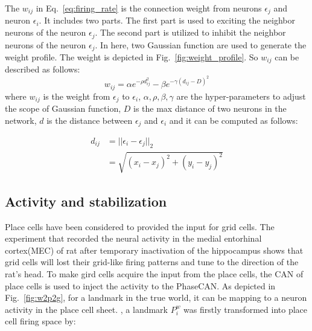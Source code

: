 \documentclass[final,5p,times,twocolumn,authoryear]{elsarticle}
\newcommand{\pt}[1]{{\color{red}{#1}}}
\begin{document}
The $w_{ij}$ in Eq.~\eqref{eq:firing_rate} is the connection weight from neurons $\epsilon_j$ and neuron $\epsilon_i$. It includes two parts. The first part is used to exciting the neighbor neurons of the neuron $\epsilon_j$. The second part is utilized to inhibit the neighbor neurons of the neuron $\epsilon_j$. In here, two Gaussian function are used to generate the weight profile. The weight is depicted in Fig.~\ref{fig:weight_profile}. So $w_{ij}$ can be described as follows:
\begin{equation}\label{eq:weight_gc}
	w_{ij}=\alpha e^{-\rho d_{ij}^2} - \beta e^{-\gamma (d_{ij}-D)^2}
\end{equation}
where $w_{ij}$ is the weight from $\epsilon_{j}$ to $\epsilon_{i}$, $\alpha,\rho,\beta,\gamma$ are the hyper-parameters to adjust the scope of Gaussian function, $D$ is the max distance of two neurons in the network, $d$ is the distance between $\epsilon_{j}$ and $\epsilon_{i}$ and it can be computed as follows:

\begin{align}
	d_{ij} &= ||\epsilon_{i} - \epsilon_{j}||_2 \\
	&=\sqrt{(x_i-x_j)^2+(y_i-y_j)^2}	 
\end{align}	

\subsection{Activity and stabilization}

Place cells have been considered to provided the input for grid cells. The experiment that recorded the neural activity in the medial entorhinal cortex(MEC) of rat after temporary inactivation of the hippocampus shows that grid cells will lost their grid-like firing patterns and tune to the direction of the rat's head\citep{Bonnevie2013}. To make gird cells acquire the input from the place cells, the CAN of place cells\citep{McNaughton2006} is used to inject the activity to the PhaseCAN. As depicted in Fig.~\ref{fig:w2p2g}, for a landmark in the true world, it can be mapping to a neuron activity in the place cell sheet. \pt{According to our previous work}, a landmark $P^w_i$ was firstly transformed into place cell firing space by:
\end{document}
